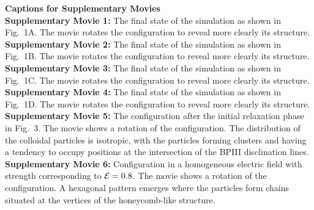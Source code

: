 \documentclass[12pt,twoside]{article}
\begin{document}
 
{\bf Captions for Supplementary Movies} \\

{\bf Supplementary Movie 1:} 
The final state of the simulation as shown in Fig.~1A. The movie
rotates the configuration to reveal more clearly its structure.\\

{\bf Supplementary Movie 2:} 
The final state of the simulation as shown in Fig.~1B. The movie
rotates the configuration to reveal more clearly its structure.\\


{\bf Supplementary Movie 3:} 
The final state of the simulation as shown in Fig.~1C. The movie
rotates the configuration to reveal more clearly its structure.\\


{\bf Supplementary Movie 4:} 
The final state of the simulation as shown in Fig.~1D. The movie
rotates the configuration to reveal more clearly its structure.\\


{\bf Supplementary Movie 5:} 
The configuration after the initial relaxation phase in Fig.~3. The movie
shows a rotation of the configuration. The distribution of the colloidal
particles is isotropic, with the particles forming clusters and having a
tendency to occupy positions at the intersection of the BPIII disclination
lines.\\

{\bf Supplementary Movie 6:} 
Configuration in a homogeneous electric field with strength
corresponding to ${\cal E}=0.8$. The movie
shows a rotation of the configuration.
A hexagonal pattern emerges where the particles form chains
situated at the vertices of the honeycomb-like structure. \\
\end{document}
